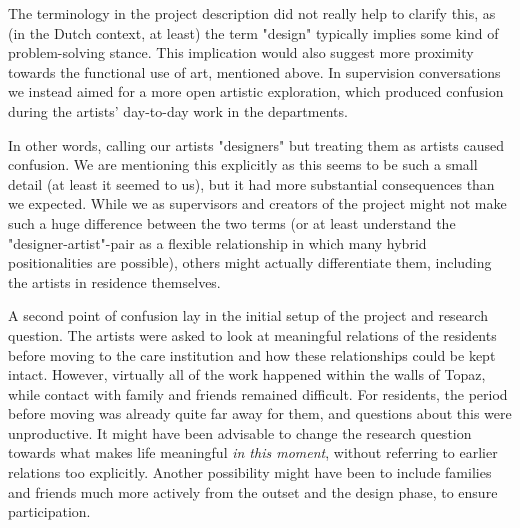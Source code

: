 \documentclass[authordate, empirical]{jote-new-article}
\begin{document}
{	

	The terminology in the project description did not really help to clarify this, as (in the Dutch context, at least) the term "design" typically implies some kind of problem-solving stance. This implication would also suggest more proximity towards the functional use of art, mentioned above. In supervision conversations we instead aimed for a more open artistic exploration, which produced confusion during the artists' day-to-day work in the departments.



	



	In other words, calling our artists "designers" but treating them as artists caused confusion. We are mentioning this explicitly as this seems to be such a small detail (at least it seemed to us), but it had more substantial consequences than we expected. While we as supervisors and creators of the project might not make such a huge difference between the two terms (or at least understand the "designer-artist"-pair as a flexible relationship in which many hybrid positionalities are possible), others might actually differentiate them, including the artists in residence themselves.







	A second point of confusion lay in the initial setup of the project and research question. The artists were asked to look at meaningful relations of the residents before moving to the care institution and how these relationships could be kept intact. However, virtually all of the work happened within the walls of Topaz, while contact with family and friends remained difficult. For residents, the period before moving was already quite far away for them, and questions about this were unproductive. It might have been advisable to change the research question towards what makes life meaningful \emph{in this moment}, without referring to earlier relations too explicitly. Another possibility might have been to include families and friends much more actively from the outset and the design phase, to ensure participation.







}
\end{document}
